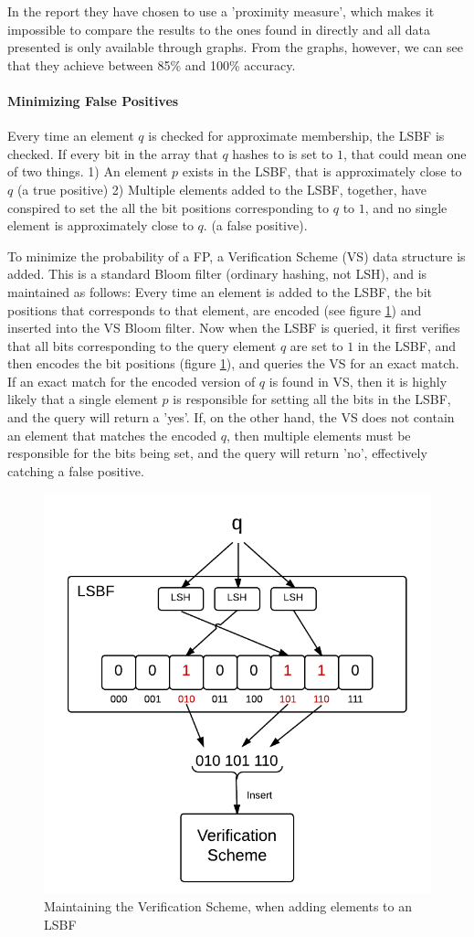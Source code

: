 \documentclass[a4paper,11pt]{article}
\begin{document}
In the report they have chosen to use a 'proximity measure', which makes it impossible to compare the results to the ones found in \cite{paper:harvard} directly and all data presented is only available through graphs. From the graphs, however, we can see that they achieve between 85\% and 100\% accuracy.

\paragraph{Minimizing False Positives}
Every time an element $q$ is checked for approximate membership, the LSBF is checked. If every bit in the array that $q$ hashes to is set to $1$, that could mean one of two things.
1) An element $p$ exists in the LSBF, that is approximately close to $q$ (a true positive)
2) Multiple elements added to the LSBF, together, have conspired to set the all the bit positions corresponding to $q$ to $1$, and no single element is approximately close to $q$. (a false positive).

To minimize the probability of a FP, a Verification Scheme (VS) data structure is added.
This is a standard Bloom filter (ordinary hashing, not LSH), and is maintained as follows: Every time an element is added to the LSBF, the bit positions that corresponds to that element, are encoded (see figure \ref{fig:verification_scheme}) and inserted into the VS Bloom filter.
Now when the LSBF is queried, it first verifies that all bits corresponding to the query element $q$ are set to $1$ in the LSBF, and then encodes the bit positions (figure \ref{fig:verification_scheme}), and queries the VS for an exact match. If an exact match for the encoded version of $q$ is found in VS, then it is highly likely that a single element $p$ is responsible for setting all the bits in the LSBF, and the query will return a 'yes'. If, on the other hand, the VS does not contain an element that matches the encoded $q$, then multiple elements must be responsible for the bits being set, and the query will return 'no', effectively catching a false positive.

\begin{figure}[H]
\centering
\includegraphics[width=.5\linewidth]{verification_scheme}
\caption{Maintaining the Verification Scheme, when adding elements to an LSBF}
\label{fig:verification_scheme}
\end{figure}
\end{document}
